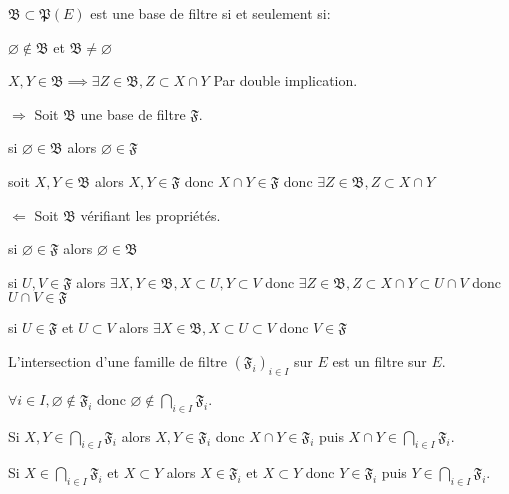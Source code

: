 \documentclass[a4paper, 11pt, french]{book}
\newenvironment{itemise}{\itemize}{\enditemize}
\theoremstyle{plain} %
\theoremstyle{definition} %
\theoremstyle{remark} %
\newcommand{\1}{\mathds{1}}
\newcommand\vide{\varnothing}
\begin{document}
\proposition
$\mathfrak{B}\subset\mathfrak{P}(E)$ est une base de filtre si et seulement si:
\begin{itemise}
	\item $\vide\notin\mathfrak{B}$ et $\mathfrak{B}\neq\vide$
	\item $X, Y\in\mathfrak{B}\implies\exists Z\in\mathfrak{B}, Z\subset X\cap Y$
\end{itemise}
\demonstration
Par double implication.
\begin{itemise}
	\item[$\Rightarrow$] Soit $\mathfrak{B}$ une base de filtre $\mathfrak{F}$.
	\begin{itemise}
		\item si $\vide\in\mathfrak{B}$ alors $\vide\in\mathfrak{F}$
		\item soit $X, Y\in\mathfrak{B}$ alors $X, Y\in\mathfrak{F}$ donc $X\cap Y\in\mathfrak{F}$ donc $\exists Z\in\mathfrak{B}, Z\subset X\cap Y$
	\end{itemise}
	\item[$\Leftarrow$] Soit $\mathfrak{B}$ vérifiant les propriétés.
	\begin{itemise}
		\item si $\vide\in\mathfrak{F}$ alors $\vide\in\mathfrak{B}$
		\item si $U, V\in\mathfrak{F}$ alors $\exists X, Y\in\mathfrak{B}, X\subset U, Y\subset V$ donc $\exists Z\in\mathfrak{B}, Z\subset X\cap Y\subset U\cap V$ donc $U\cap V\in\mathfrak{F}$
		\item si $U\in\mathfrak{F}$ et $U\subset V$ alors $\exists X\in\mathfrak{B}, X\subset U\subset V$ donc $V\in\mathfrak{F}$
	\end{itemise}
\end{itemise}

\proposition
L'intersection d'une famille de filtre $(\mathfrak{F}_i)_{i\in I}$ sur $E$ est un filtre sur $E$.
\demonstration
\begin{itemise}
	\item $\forall i\in I, \vide\notin\mathfrak{F}_i$ donc $\vide\notin\bigcap_{i\in I}\mathfrak{F}_i$.
	\item Si $X, Y\in\bigcap_{i\in I}\mathfrak{F}_i$ alors $X, Y\in\mathfrak{F}_i$ donc $X\cap Y\in\mathfrak{F}_i$ puis $X\cap Y\in\bigcap_{i\in I}\mathfrak{F}_i$.
	\item Si $X\in\bigcap_{i\in I}\mathfrak{F}_i$ et $X\subset Y$ alors $X\in\mathfrak{F}_i$ et $X\subset Y$ donc $Y\in\mathfrak{F}_i$ puis $Y\in\bigcap_{i\in I}\mathfrak{F}_i$.
\end{itemise}
\end{document}
